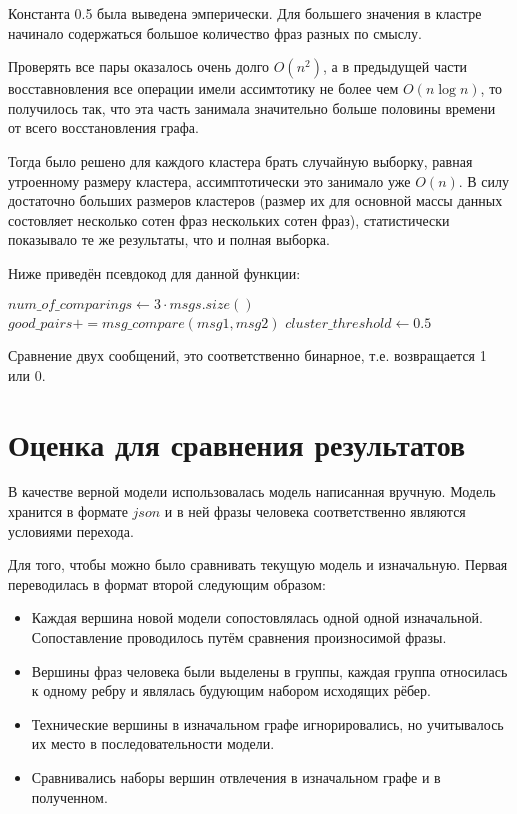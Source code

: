 \documentclass[specification,annotation]{itmo-student-thesis}
\begin{document}
	Константа 0.5 была выведена эмперически. Для большего значения в кластре начинало содержаться большое количество фраз разных по смыслу. 
	
	Проверять все пары оказалось очень долго $O(n^2)$, а в предыдущей части восставновления все операции имели ассимтотику не более чем $O(n \log n)$, то получилось так, что эта часть занимала значительно больше половины времени от всего восстановления графа. 
	
	Тогда было решено для каждого кластера брать случайную выборку, равная утроенному размеру кластера, ассимптотически это занимало уже $O(n)$. В силу достаточно больших размеров кластеров (размер их для основной массы данных состовляет несколько сотен фраз нескольких сотен фраз), статистически показывало те же результаты, что и полная выборка.
	
	Ниже приведён псевдокод для данной функции:
	
	\begin{algorithmic}
			\State $num\_of\_comparings \gets 3 \cdot msgs.size()$
				\State $good\_pairs += msg\_compare(msg1, msg2)$
			\EndFor
			\State $cluster\_threshold \gets 0.5$
			\State {}
		\EndFunction
	\end{algorithmic}

	Сравнение двух сообщений, это соответственно бинарное, т.е. возвращается 1 или 0.
	
	\section{Оценка для сравнения результатов}
	В качестве верной модели использовалась модель написанная вручную. Модель хранится в формате $json$ и в ней фразы человека соответственно являются условиями перехода.
	
	Для того, чтобы можно было сравнивать текущую модель и изначальную. Первая переводилась в формат второй следующим образом:
	\begin{itemize}
		\item Каждая вершина новой модели сопостовлялась одной одной изначальной. Сопоставление проводилось путём сравнения произносимой фразы.
		\item Вершины фраз человека были выделены в группы, каждая группа относилась к одному ребру и являлась будующим набором исходящих рёбер.
		\item Технические вершины в изначальном графе игнорировались, но учитывалось их место в последовательности модели.
		\item Сравнивались наборы вершин отвлечения в изначальном графе и в полученном.
	\end{itemize}
	
\end{document}
